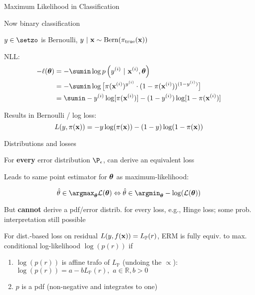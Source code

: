 \documentclass[11pt,compress,t,notes=noshow, xcolor=table]{beamer}
\begin{document}
\begin{framei}[sep=M]{Maximum Likelihood in Classification}

\item Now binary classification
\item $y \in \setzo$ is Bernoulli, $y ~|~ \mathbf{x} \sim \text{Bern}(\pi_\text{true}(\mathbf{x}))$
\item  NLL:
\begin{align*}
- \loglt &= -\sumin \lpdfyigxit \\ 
&= - \sumin \log \big[\pi(\xi)^{y^{(i)}} \cdot (1 - \pi(\xi))^{(1 - y^{(i)})} \big]\\
&= \sumin -\yi \log[\pi(\xi)] - (1-\yi) \log [1 - \pi(\xi)]
\end{align*}
\item Results in Bernoulli / log loss:
$$
  L(y, \pi(\mathbf{x})) = -y\log(\pi(\mathbf{x}))-(1-y)\log(1-\pi(\mathbf{x}))
$$


\end{framei}




\begin{framei}[sep=L]{Distributions and losses}

\item For \textbf{every} error distribution $\P_\eps$, can derive an equivalent loss
\item Leads to same point estimator for $\bm{\theta}$ as maximum-likelihood:

$$
\thetah \in \argmax_{\thetav} \LL(\thetav) \Leftrightarrow \thetah \in \argmin_{\thetav}-\log(\LL(\thetav))
$$
    
\item But \textbf{cannot} derive a pdf/error distrib. for every loss, e.g., Hinge loss; some prob. interpretation still possible 

\item For dist.-based loss on residual $L(y,f(\mathbf{x}))=L_{\mathbb{P}}(r)$, ERM is fully equiv. to max. conditional log-likelihood $\log(p(r))$ if
\begin{enumerate}
    \item $\log(p(r))$ is affine trafo of $L_{\mathbb{P}}$ (undoing the $\propto$):
    $\log(p(r)) = a - bL_{\mathbb{P}}(r),\,\,a \in \mathbb{R}, b>0$
    \item  $p$ is a pdf (non-negative and integrates to one)
\end{enumerate}

\end{framei}


\endlecture
\end{document}
